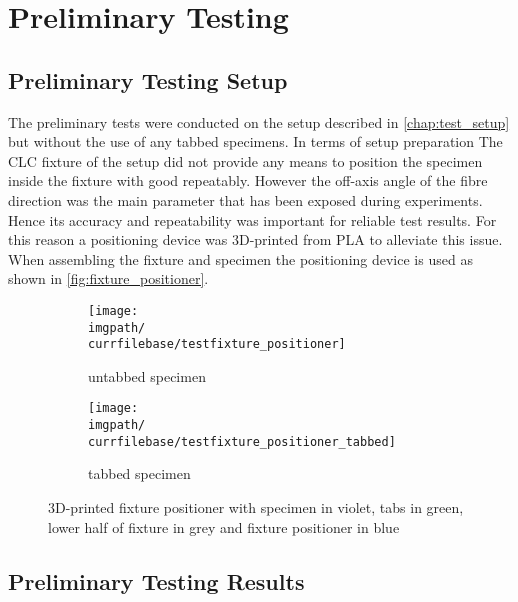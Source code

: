 \chapter{Preliminary Testing}
\label{chap:\currfilebase}

\section{Preliminary Testing Setup}
\label{sec:preliminary_testing_setup}

The preliminary tests were conducted on the setup described in \autoref{chap:test_setup} but without the use of any tabbed specimens. In terms of setup preparation The CLC fixture of the setup did not provide any means to position the specimen inside the fixture with good repeatably. However the off-axis angle of the fibre direction was the main parameter that has been exposed during experiments. Hence its accuracy and repeatability was important for reliable test results. For this reason a positioning device was 3D-printed from PLA to alleviate this issue. When assembling the fixture and specimen the positioning device is used as shown in \autoref{fig:fixture_positioner}.

\begin{figure}[!ht]
    \centering
    \begin{subfigure}[t]{\dimexpr(\distTextWidth-\distColSep)/2\relax}
        \centering
        \texttt{[image: \\imgpath/\\currfilebase/testfixture\_positioner]}
        \caption{untabbed specimen}
        \label{fig:fixture_positioner_untabbed}
    \end{subfigure}%
    \hfill
    \begin{subfigure}[t]{\dimexpr(\distTextWidth-\distColSep)/2\relax}
        \centering
        \texttt{[image: \\imgpath/\\currfilebase/testfixture\_positioner\_tabbed]}
        \caption{tabbed specimen}
        \label{fig:fixture_positioner_tabbed}
    \end{subfigure}
    \caption{3D-printed fixture positioner with specimen in violet, tabs in green, lower half of fixture in grey and fixture positioner in blue}
    \label{fig:fixture_positioner}
\end{figure}

\section{Preliminary Testing Results}
\label{sec:preliminary_testing_results}

